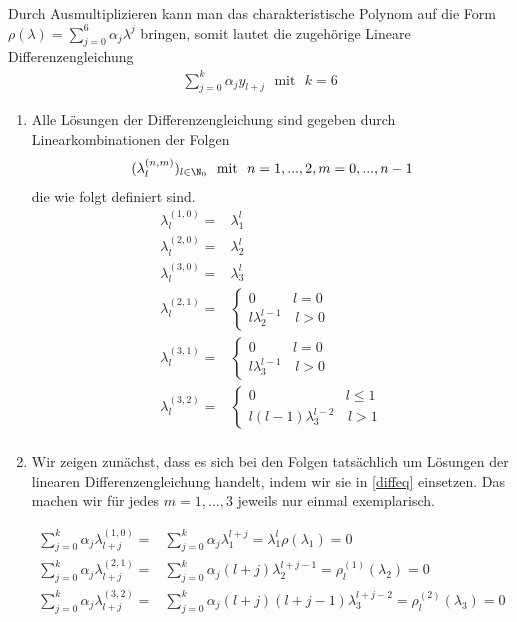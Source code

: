 \begin{solution}
Durch Ausmultiplizieren kann man das charakteristische Polynom auf die Form $\rho(\lambda) = \sum_{j=0}^{6}\alpha_j \lambda^j$ bringen, somit lautet die zugehörige Lineare Differenzengleichung
\begin{align}\label{diffeq}
  \sum_{j=0}^{k} \alpha_j y_{l+j} \text{~~mit~~} k=6
\end{align}
\begin{enumerate}[label = \textbf{\alph*)}]
  \item Alle Lösungen der Differenzengleichung sind gegeben durch Linearkombinationen der Folgen
  \begin{align*}
    (\lambda_{l}^{(n,m)})_{l \in \N_0} \text{~~mit~~} n = 1,...,2, m = 0,...,n-1
  \end{align*}
  die wie folgt definiert sind.
  \begin{align*}
    \lambda_{l}^{(1,0)} =& \lambda_1^l \\
    \lambda_{l}^{(2,0)} =& \lambda_2^l \\
    \lambda_{l}^{(3,0)} =& \lambda_3^l \\
    \lambda_{l}^{(2,1)} =& \begin{cases}
0 & l = 0 \\
l \lambda_2^{l-1} & \, l > 0
\end{cases} \\
    \lambda_{l}^{(3,1)} =& \begin{cases}
0 & l = 0 \\
l \lambda_3^{l-1} & \, l > 0
\end{cases} \\
    \lambda_{l}^{(3,2)} =& \begin{cases}
0 & l \leq 1 \\
l(l-1) \lambda_3^{l-2} & \, l > 1
\end{cases} \\
  \end{align*}

  \item Wir zeigen zunächst, dass es sich bei den Folgen tatsächlich um Lösungen der linearen Differenzengleichung handelt, indem wir sie in \eqref{diffeq} einsetzen. Das machen wir für jedes $m=1,...,3$ jeweils nur einmal exemplarisch.

  \begin{align*}
    \sum_{j=0}^{k} \alpha_j \lambda_{l+j}^{(1,0)} =& \sum_{j=0}^{k} \alpha_j \lambda_1^{l+j} = \lambda_1^l \rho(\lambda_1) = 0 \\
    \sum_{j=0}^{k} \alpha_j \lambda_{l+j}^{(2,1)} =& \sum_{j=0}^{k} \alpha_j (l+j)\lambda_2^{l+j-1} = \rho_l^{(1)}(\lambda_2) = 0 \\
    \sum_{j=0}^{k} \alpha_j \lambda_{l+j}^{(3,2)} =& \sum_{j=0}^{k} \alpha_j (l+j)(l+j-1)\lambda_3^{l+j-2} = \rho_l^{(2)}(\lambda_3) = 0
  \end{align*}


\end{enumerate}
\end{solution}
